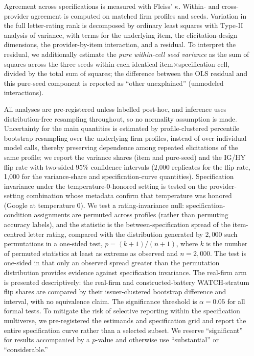 \documentclass[a4paper,fleqn]{cas-sc}
\begin{document}
Agreement across specifications is measured with Fleiss' $\kappa$. Within- and cross-provider agreement
is computed on matched firm profiles and seeds. Variation in the full letter-rating rank is decomposed by
ordinary least squares with Type-II analysis of variance, with terms for the underlying item, the
elicitation-design dimensions, the provider-by-item interaction, and a residual. To interpret the
residual, we additionally estimate the \emph{pure within-cell seed variance} as the sum of squares across
the three seeds within each identical item$\times$specification cell, divided by the total sum of squares;
the difference between the OLS residual and this pure-seed component is reported as ``other unexplained''
(unmodeled interactions).

All analyses are pre-registered unless labelled post-hoc, and inference uses distribution-free resampling
throughout, so no normality assumption is made. Uncertainty for the main quantities is estimated by
profile-clustered percentile bootstrap resampling over the underlying firm profiles, instead of over
individual model calls, thereby preserving dependence among repeated elicitations of the same profile; we
report the variance shares (item and pure-seed) and the IG/HY flip rate with
two-sided 95\% confidence intervals (2{,}000 replicates for the flip rate, 1{,}000 for the
variance-share and specification-curve quantities). Specification invariance under the temperature-0-honored
setting is tested on the provider-setting combination whose metadata confirm that temperature was
honored (Google at temperature 0). We test a rating-invariance null: specification-condition assignments
are permuted across profiles (rather than permuting accuracy labels), and the statistic is the
between-specification spread of the item-centred letter rating, compared with the distribution generated
by $2{,}000$ such permutations in a one-sided test, $p=(k{+}1)/(n{+}1)$, where $k$ is the number of
permuted statistics at least as extreme as observed and $n=2{,}000$. The test is one-sided in that only an
observed spread greater than the permutation distribution provides evidence against specification
invariance. The real-firm arm is presented descriptively: the real-firm and constructed-battery
WATCH-stratum flip shares are compared by their issuer-clustered bootstrap difference and interval, with
no equivalence claim. The significance threshold is $\alpha=0.05$ for all
formal tests. To mitigate the risk of selective reporting within the specification multiverse, we
pre-registered the estimands and specification grid and report the entire specification curve rather than
a selected subset. We reserve ``significant'' for results accompanied by a $p$-value and otherwise use
``substantial'' or ``considerable.''
\end{document}

